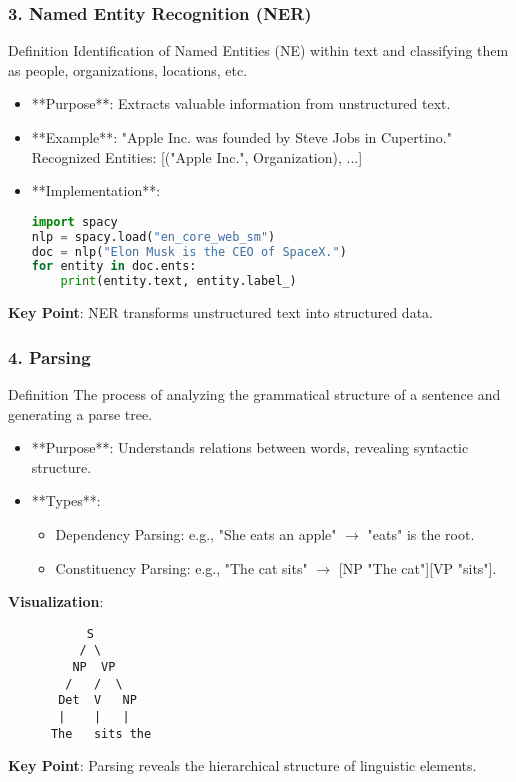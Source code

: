 \documentclass[aspectratio=169]{beamer}
\begin{document}
\begin{frame}
    \frametitle{3. Named Entity Recognition (NER)}
    \begin{block}{Definition}
        Identification of Named Entities (NE) within text and classifying them as people, organizations, locations, etc.
    \end{block}
    
    \begin{itemize}
        \item **Purpose**: Extracts valuable information from unstructured text.
        \item **Example**: "Apple Inc. was founded by Steve Jobs in Cupertino." 
        Recognized Entities: [("Apple Inc.", Organization), ...]
        
        \item **Implementation**:
        \begin{lstlisting}[language=Python]
import spacy
nlp = spacy.load("en_core_web_sm")
doc = nlp("Elon Musk is the CEO of SpaceX.")
for entity in doc.ents:
    print(entity.text, entity.label_)
        \end{lstlisting}
    \end{itemize}
    
    \textbf{Key Point}: NER transforms unstructured text into structured data.
\end{frame}

\begin{frame}
    \frametitle{4. Parsing}
    \begin{block}{Definition}
        The process of analyzing the grammatical structure of a sentence and generating a parse tree.
    \end{block}
    
    \begin{itemize}
        \item **Purpose**: Understands relations between words, revealing syntactic structure.
        \item **Types**:
        \begin{itemize}
            \item Dependency Parsing: e.g., "She eats an apple" $\rightarrow$ "eats" is the root.
            \item Constituency Parsing: e.g., "The cat sits" $\rightarrow$ [NP "The cat"][VP "sits"].
        \end{itemize}
    \end{itemize}

    \textbf{Visualization}:
    \begin{verbatim}
           S
          / \
         NP  VP
        /   /  \
       Det  V   NP
       |    |   |
      The   sits the
    \end{verbatim}
    
    \textbf{Key Point}: Parsing reveals the hierarchical structure of linguistic elements.
\end{frame}
\end{document}
